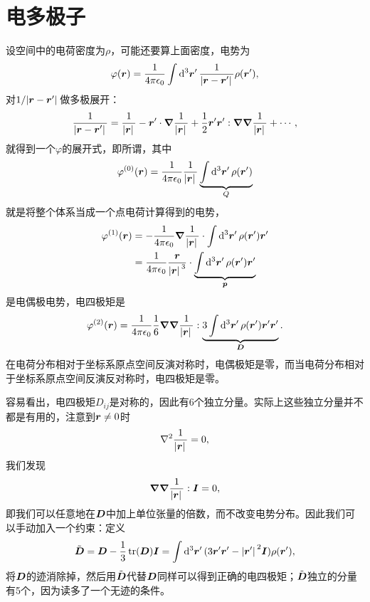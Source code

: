 \section{电多极子}

设空间中的电荷密度为$\rho$，可能还要算上面密度，电势为
\[
    \varphi(\vb*{r}) = \frac{1}{4\pi \epsilon_0} \int \dd[3]{\vb*{r}'} \frac{1}{\abs*{\vb*{r} - \vb*{r}'}} \rho(\vb*{r}'),
\]
对$1/\abs*{\vb*{r}-\vb*{r}'}$做多极展开：
\[
    \frac{1}{\abs*{\vb*{r}-\vb*{r}'}} = \frac{1}{\abs*{\vb*{r}}} - \vb*{r}' \cdot \grad{\frac{1}{\abs*{\vb*{r}}}} + \frac{1}{2} \vb*{r}' \vb*{r}' : \grad{\grad{\frac{1}{\abs*{\vb*{r}}}}} + \cdots,
\]
就得到一个$\varphi$的展开式，即所谓，其中
\begin{equation}
    \varphi^{(0)}(\vb*{r}) = \frac{1}{4\pi \epsilon_0} \frac{1}{\abs*{\vb*{r}}} \underbrace{\int \dd[3]{\vb*{r}'} \rho(\vb*{r}')}_{Q}
\end{equation}
就是将整个体系当成一个点电荷计算得到的电势，
\begin{equation}
    \begin{aligned}
        \varphi^{(1)}(\vb*{r}) &= - \frac{1}{4\pi \epsilon_0} \grad{\frac{1}{\abs*{\vb*{r}}}} \cdot \int \dd[3]{\vb*{r}'} \rho(\vb*{r}') \vb*{r}' \\
        &= \frac{1}{4\pi \epsilon_0} \frac{\vb*{r}}{\abs*{\vb*{r}}^3} \cdot \underbrace{\int \dd[3]{\vb*{r}'} \rho(\vb*{r}') \vb*{r}'}_{\vb*{p}}
    \end{aligned}
\end{equation}
是电偶极电势，电四极矩是
\begin{equation}
    \varphi^{(2)}(\vb*{r}) = \frac{1}{4 \pi \epsilon_0} \frac{1}{6} \grad{\grad{\frac{1}{\abs*{\vb*{r}}}}} : \underbrace{3 \int \dd[3]{\vb*{r}'} \rho(\vb*{r}') \vb*{r}' \vb*{r}' }_{\vb*{D}}.
\end{equation}
在电荷分布相对于坐标系原点空间反演对称时，电偶极矩是零，而当电荷分布相对于坐标系原点空间反演反对称时，电四极矩是零。

容易看出，电四极矩$D_{ij}$是对称的，因此有6个独立分量。实际上这些独立分量并不都是有用的，注意到$\vb*{r} \neq 0$时
\[
    \laplacian{\frac{1}{\abs*{\vb*{r}}}} = 0,
\]
我们发现
\[
    \grad{\grad{\frac{1}{\abs*{\vb*{r}}}}} : \vb*{I} = 0,
\]
即我们可以任意地在$\vb*{D}$中加上单位张量的倍数，而不改变电势分布。因此我们可以手动加入一个约束：定义
\begin{equation}
    \tilde{\vb*{D}} = \vb*{D} - \frac{1}{3} \trace(\vb*{D}) \vb*{I} = \int \dd[3]{\vb*{r}'} (3 \vb*{r}' \vb*{r}' - \abs*{\vb*{r}'}^2 \vb*{I}) \rho(\vb*{r}') ,
\end{equation}
将$\vb*{D}$的迹消除掉，然后用$\tilde{\vb*{D}}$代替$\vb*{D}$同样可以得到正确的电四极矩；$\tilde{\vb*{D}}$独立的分量有5个，因为读多了一个无迹的条件。

